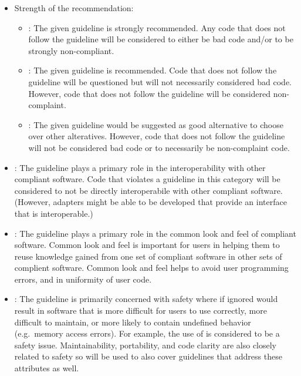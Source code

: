 \begin{itemize}

{}\item Strength of the recommendation:

  \begin{itemize}

  {}\item\textbf{\StrongRecGC}: The given guideline is strongly
  recommended.  Any code that does not follow the guideline will be
  considered to either be bad code and/or to be strongly
  non-compliant.

  {}\item\textbf{\RecGC}: The given guideline is recommended.  Code
  that does not follow the guideline will be questioned but will not
  necessarily considered bad code.  However, code that does not follow
  the guideline will be considered non-complaint.

  {}\item\textbf{\SuggestGC}: The given guideline would be suggested
  as good alternative to choose over other alteratives.  However, code
  that does not follow the guideline will not be considered bad code
  or to necessarily be non-complaint code.

   \end{itemize}

{}\item\textbf{\InteropGC}: The guideline plays a primary role in the
interoperability with other compliant software.  Code that violates a
{}\StrongRecGC{} guideline in this category will be considered to not
be directly interoperabile with other compliant software.  (However,
adapters might be able to be developed that provide an interface that
is interoperable.)

{}\item\textbf{\ComLookFeelGC}: The guideline plays a primary role in
the common look and feel of compliant software.  Common look and feel
is important for users in helping them to reuse knowledge gained from
one set of compliant software in other sets of complient software.
Common look and feel helps to avoid user programming errors, and in
uniformity of user code.

{}\item\textbf{\SafetyGC}: The guideline is primarily concerned with
safety where if ignored would result in software that is more
difficult for users to use correctly, more difficult to maintain, or
more likely to contain undefined behavior (e.g.\ memory access
errors).  For example, the use of {} is considered to be a
safety issue.  Maintainability, portability, and code clarity are also
closely related to safety so {}\SafetyGC{} will be used to also cover
guidelines that address these attributes as well.


\end{itemize}
